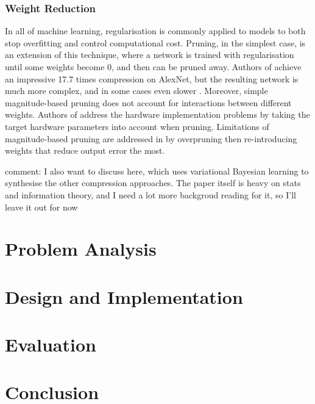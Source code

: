 \documentclass[12pt]{article}
\begin{document}
\subsubsection{Weight Reduction}
In all of machine learning, regularisation is commonly applied to models to both stop overfitting
and control computational cost.
Pruning, in the simplest case, is an extension of this technique, where a network is trained
with regularisation until some weights become 0, and then can be pruned away.
Authors of \cite{guo2016dynamic} achieve an impressive 17.7 times compression on AlexNet,
but the resulting network is much more complex, and in some cases even slower \cite{yu2017scalpel}.
Moreover, simple magnitude-based pruning does not account for interactions between different
weights.
Authors of \cite{yu2017scalpel} address the hardware implementation problems by taking the
target hardware parameters into account when pruning.
Limitations of magnitude-based pruning are addressed in \cite{yang2017designing} by overpruning
then re-introducing weights that reduce output error the most.

comment: I also want to discuss \cite{ullrich2017soft} here, which uses variational Bayesian learning
to synthesise the other compression approaches.
The paper itself is heavy on stats and information theory, and I need a lot more backgroud
reading for it, so I'll leave it out for now 
\section{Problem Analysis}

\section{Design and Implementation}

\section{Evaluation}

\section{Conclusion}


\end{document}
